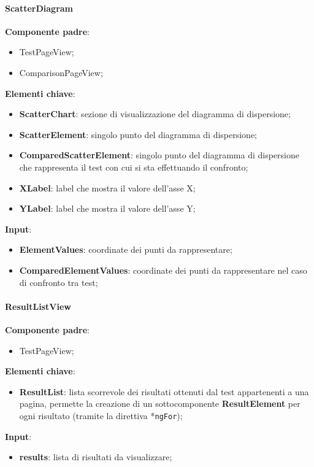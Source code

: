 \paragraph{ScatterDiagram}
\textbf{Componente padre}:
\begin{itemize}
    \item TestPageView;
    \item ComparisonPageView;
\end{itemize}
\textbf{Elementi chiave}:
\begin{itemize}
    \item \textbf{ScatterChart}: sezione di visualizzazione del diagramma di dispersione;
    \item \textbf{ScatterElement}: singolo punto del diagramma di dispersione;
    \item \textbf{ComparedScatterElement}: singolo punto del diagramma di dispersione che rappresenta il test con cui si sta effettuando il confronto;
    \item \textbf{XLabel}: label che mostra il valore dell'asse X;
    \item \textbf{YLabel}: label che mostra il valore dell'asse Y;
\end{itemize}
\textbf{Input}:
\begin{itemize}
    \item \textbf{ElementValues}: coordinate dei punti da rappresentare;
    \item \textbf{ComparedElementValues}: coordinate dei punti da rappresentare nel caso di confronto tra test;
\end{itemize}
\paragraph{ResultListView}
\textbf{Componente padre}:
\begin{itemize}
    \item TestPageView;
\end{itemize}
\textbf{Elementi chiave}:
\begin{itemize}
    \item \textbf{ResultList}: lista scorrevole dei risultati ottenuti dal test appartenenti a una pagina, permette la creazione di un sottocomponente \textbf{ResultElement} per ogni risultato (tramite la direttiva *\texttt{ngFor});
\end{itemize}
\textbf{Input}:
\begin{itemize}
    \item \textbf{results}: lista di risultati da visualizzare;
\end{itemize}

